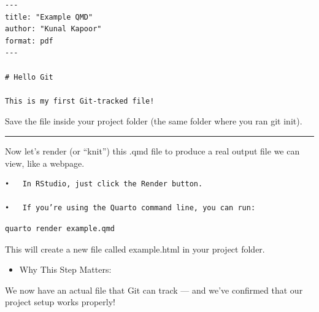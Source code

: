 \documentclass[
  11pt,
  a4paper,
]{article}
\providecommand{\tightlist}{%
  \setlength{\itemsep}{0pt}\setlength{\parskip}{0pt}}\usepackage{longtable,booktabs,array}
\begin{document}
\begin{verbatim}
---
title: "Example QMD"
author: "Kunal Kapoor"
format: pdf
---

# Hello Git

This is my first Git-tracked file!
\end{verbatim}

Save the file inside your project folder (the same folder where you ran
git init).

\begin{center}\rule{0.5\linewidth}{0.5pt}\end{center}

Now let's render (or ``knit'') this .qmd file to produce a real output
file we can view, like a webpage.

\begin{verbatim}
•   In RStudio, just click the Render button.

•   If you’re using the Quarto command line, you can run:
\end{verbatim}

\begin{verbatim}
quarto render example.qmd
\end{verbatim}

This will create a new file called example.html in your project folder.

\begin{itemize}
\tightlist
\item
  Why This Step Matters:
\end{itemize}

We now have an actual file that Git can track --- and we've confirmed
that our project setup works properly!
\end{document}

